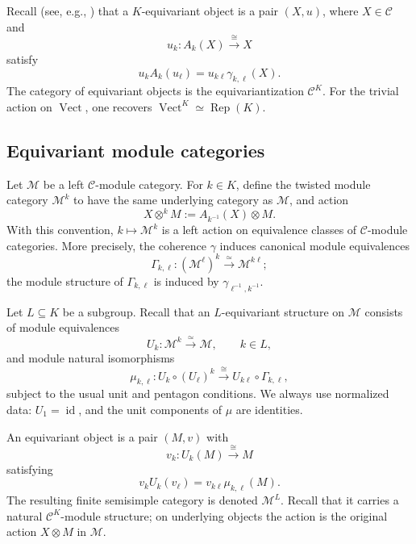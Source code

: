 \documentclass{amsart}
\theoremstyle{definition}
\newcommand{\id}{\operatorname{id}}
\newcommand{\Rep}{\operatorname{Rep}}
\newcommand{\Vect}{\operatorname{Vect}}
\newcommand{\C}{\mathscr{C}}
\newcommand{\M}{\mathscr{M}}
\numberwithin{equation}{section}
\begin{document}
Recall (see, e.g., \cite[Definition 2.7.2]{EGNO}) that a $K$-equivariant object is a pair $(X,u)$, where $X\in\C$ and
\[
 u_k:A_k(X)\xrightarrow{\cong}X
\]
satisfy
\begin{equation}\label{eq:equivariant-object}
 u_kA_k(u_\ell)=u_{k\ell}\gamma_{k,\ell}(X).
\end{equation}
The category of equivariant objects is the equivariantization $\C^K$.
For the trivial action on $\Vect$, one recovers $\Vect^K\simeq\Rep(K)$.

\subsection{Equivariant module categories}\label{sec:equivariant-modules}

Let $\M$ be a left $\C$-module category.  For $k\in K$, define the twisted module
category $\M^k$ to have the same underlying category as $\M$, and action
\begin{equation}\label{eq:module-twist}
 X\otimes^k M:=A_{k^{-1}}(X)\otimes M.
\end{equation}
With this convention, $k\mapsto\M^k$ is a left action on equivalence classes of
$\C$-module categories.  More precisely, the coherence $\gamma$ induces canonical
module equivalences
\[
 \Gamma_{k,\ell}:(\M^\ell)^k\xrightarrow{\simeq}\M^{k\ell};
\]
the module structure of $\Gamma_{k,\ell}$ is induced by
$\gamma_{\ell^{-1},k^{-1}}$.

Let $L\subseteq K$ be a subgroup.  Recall \cite{ENO} that an $L$-equivariant structure on $\M$ consists of module
equivalences
\[
 U_k:\M^k\xrightarrow{\simeq}\M,
 \qquad k\in L,
\]
and module natural isomorphisms
\begin{equation}\label{eq:mu-abstract}
 \mu_{k,\ell}:U_k\circ(U_\ell)^k
 \xrightarrow{\cong}
 U_{k\ell}\circ\Gamma_{k,\ell},
\end{equation}
subject to the usual unit and pentagon conditions.  We always use normalized data:
$U_1=\id$, and the unit components of $\mu$ are identities.

An equivariant object is a pair $(M,v)$ with
\[
 v_k:U_k(M)\xrightarrow{\cong}M
\]
satisfying
\begin{equation}\label{eq:equivariant-module-object}
 v_kU_k(v_\ell)=v_{k\ell}\mu_{k,\ell}(M).
\end{equation}
The resulting finite semisimple category is denoted $\M^L$.  Recall \cite{ENO} that it carries a natural
$\C^K$-module structure; on underlying objects the action is the original action
$X\otimes M$ in $\M$.
\end{document}
